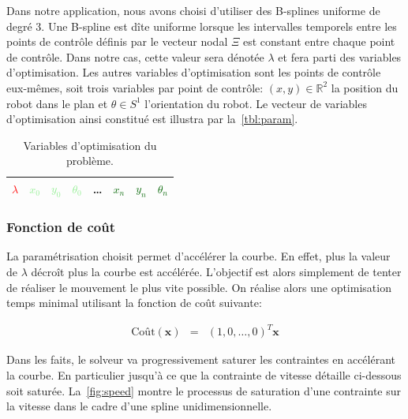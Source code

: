 Dans notre application, nous avons choisi d'utiliser des B-splines
uniforme de degré 3. Une B-spline est dîte uniforme lorsque les
intervalles temporels entre les points de contrôle définis par le
vecteur nodal $\Xi$ est constant entre chaque point de contrôle. Dans
notre cas, cette valeur sera dénotée $\lambda$ et fera parti des
variables d'optimisation. Les autres variables d'optimisation sont les
points de contrôle eux-mêmes, soit trois variables par point de
contrôle: $(x,y) \in \mathbb{R}^2$ la position du robot dans le plan
et $\theta \in S^1$ l'orientation du robot. Le vecteur de variables
d'optimisation ainsi constitué est illustra par
la~\autoref{tbl:param}.

\begin{table}[htbp]
  \begin{center}
\begin{tabular}{|l|l l l|l|l l l|}
  \hline
  \textcolor{red}{$\lambda$}
  & \textcolor{LightGreen}{$x_0$}
  & \textcolor{LightGreen}{$y_0$}
  & \textcolor{LightGreen}{$\theta_0$}
  & \ldots
  & \textcolor{DarkGreen}{$x_n$}
  & \textcolor{DarkGreen}{$y_n$}
  & \textcolor{DarkGreen}{$\theta_n$} \\
  \hline
\end{tabular}
  \end{center}
  \caption{Variables d'optimisation du problème. \label{tbl:param}}
\end{table}

\subsubsection{Fonction de coût}


La paramétrisation choisit permet d'accélérer la courbe. En effet,
plus la valeur de $\lambda$ décroît plus la courbe est
accélérée. L'objectif est alors simplement de tenter de réaliser le
mouvement le plus vite possible. On réalise alors une optimisation
temps minimal utilisant la fonction de coût
suivante:

\begin{eqnarray}
\text{Coût}(\mathbf{x}) & = & (1, 0, \dotsc, 0)^T \mathbf{x}
\end{eqnarray}

Dans les faits, le solveur va progressivement saturer les contraintes
en accélérant la courbe. En particulier jusqu'à ce que la contrainte
de vitesse détaille ci-dessous soit saturée. La~\autoref{fig:speed}
montre le processus de saturation d'une contrainte sur la vitesse dans
le cadre d'une spline unidimensionnelle.

